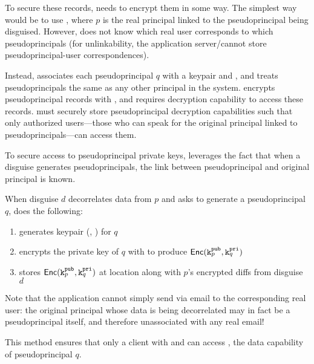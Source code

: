 To secure these records, \sys needs to encrypt them in some way. The simplest way would be to use
, where $p$ is the real principal linked to the pseudoprincipal being disguised.
However, \sys does not know which real user corresponds to which pseudoprincipals (for
unlinkability, the application server/\sys cannot store pseudoprincipal-user correspondences). 

Instead, \sys associates each pseudoprincipal $q$ with a keypair  and , and treats
pseudoprincipals the same as any other principal in the system. \sys encrypts pseudoprincipal records
with , and requires decryption capability  to access these records. \sys must
securely store pseudoprincipal decryption capabilities  such that only authorized
users---those who can speak for the original principal linked to pseudoprincipals---can
access them.

To secure access to pseudoprincipal private keys, \sys leverages the fact that 
when a disguise generates pseudoprincipals, the link between pseudoprincipal and original principal
is known. 

When disguise $d$ decorrelates data from $p$ and asks \sys to generate a pseudoprincipal $q$, \sys does the following: 
\begin{enumerate}
    \item \sys generates keypair (, ) for $q$
    \item encrypts the private key of $q$ with  to produce $\mathsf{Enc}(\texttt{\ensuremath{\texttt{k}^{\text{pub}}_{p}}}, \texttt{\ensuremath{\texttt{k}^{\text{pri}}_{q}}})$
    \item stores $\mathsf{Enc}(\texttt{\ensuremath{\texttt{k}^{\text{pub}}_{p}}}, \texttt{\ensuremath{\texttt{k}^{\text{pri}}_{q}}})$ at location  along with $p$'s encrypted diffs from disguise $d$
\end{enumerate}

Note that the application cannot simply send  via \eg email to the corresponding
real user: the original principal whose data is being decorrelated may in fact be a pseudoprincipal
itself, and therefore unassociated with any real email!

This method ensures that only a client with  and  can access , the data
capability of pseudoprincipal $q$. 

